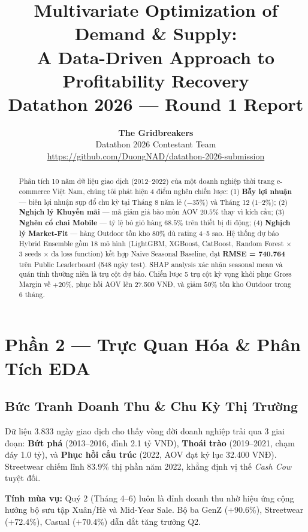 \documentclass{article}
\title{\textbf{Multivariate Optimization of Demand \& Supply:}\\
\textbf{A Data-Driven Approach to Profitability Recovery}\\[4pt]
\large Datathon 2026 — Round 1 Report}
\author{
  \textbf{The Gridbreakers}\\
  Datathon 2026 Contestant Team\\[4pt]
  {\small \url{https://github.com/DuongNAD/datathon-2026-submission}}
}
\date{}
\begin{document}
\maketitle

\begin{abstract}
\noindent
Phân tích 10 năm dữ liệu giao dịch (2012--2022) của một doanh nghiệp thời trang e-commerce Việt Nam, chúng tôi phát hiện 4 điểm nghẽn chiến lược: (1) \textbf{Bẫy lợi nhuận} — biên lợi nhuận sụp đổ chu kỳ tại Tháng 8 năm lẻ ($-35\%$) và Tháng 12 ($1\text{--}2\%$); (2) \textbf{Nghịch lý Khuyến mãi} — mã giảm giá bào mòn AOV $20.5\%$ thay vì kích cầu; (3) \textbf{Nghẽn cổ chai Mobile} — tỷ lệ bỏ giỏ hàng $68.5\%$ trên thiết bị di động; (4) \textbf{Nghịch lý Market-Fit} — hàng Outdoor tồn kho $80\%$ dù rating 4--5 sao. Hệ thống dự báo Hybrid Ensemble gồm 18 mô hình (LightGBM, XGBoost, CatBoost, Random Forest $\times$ 3 seeds $\times$ đa loss function) kết hợp Naive Seasonal Baseline, đạt \textbf{RMSE = 740.764} trên Public Leaderboard (548 ngày test). SHAP analysis xác nhận seasonal mean và quán tính thường niên là trụ cột dự báo. Chiến lược 5 trụ cột kỳ vọng khôi phục Gross Margin về $+20\%$, phục hồi AOV lên 27.500 VNĐ, và giảm $50\%$ tồn kho Outdoor trong 6 tháng.
\end{abstract}

\section*{Phần 2 — Trực Quan Hóa \& Phân Tích EDA}

\subsection*{Bức Tranh Doanh Thu \& Chu Kỳ Thị Trường}

Dữ liệu 3.833 ngày giao dịch cho thấy vòng đời doanh nghiệp trải qua 3 giai đoạn: \textbf{Bứt phá} (2013--2016, đỉnh 2.1 tỷ VNĐ), \textbf{Thoái trào} (2019--2021, chạm đáy 1.0 tỷ), và \textbf{Phục hồi cấu trúc} (2022, AOV đạt kỷ lục 32.400 VNĐ). Streetwear chiếm lĩnh $83.9\%$ thị phần năm 2022, khẳng định vị thế \textit{Cash Cow} tuyệt đối.

\textbf{Tính mùa vụ:} Quý 2 (Tháng 4--6) luôn là đỉnh doanh thu nhờ hiệu ứng cộng hưởng bộ sưu tập Xuân/Hè và Mid-Year Sale. Bộ ba GenZ ($+90.6\%$), Streetwear ($+72.4\%$), Casual ($+70.4\%$) dẫn dắt tăng trưởng Q2.
\end{document}
